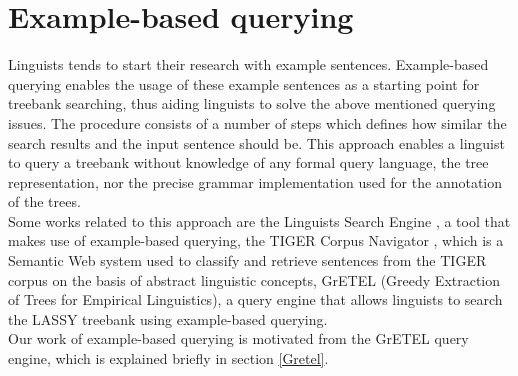 \documentclass[]{scrartcl}
\theoremstyle{exmp}
\begin{document}
\section{Example-based querying}\label{ExampleBasedQuerying}
Linguists tends to start their research with example sentences. Example-based querying enables the usage of these example sentences as a starting point for treebank searching, thus aiding linguists to solve the above mentioned querying issues. The procedure consists of a number of steps which defines how similar the search results and the input sentence should be. This approach enables a linguist to query a treebank without knowledge of any formal query language, the tree representation, nor the precise grammar implementation used for the annotation of the trees.\\
Some works related to this approach are the Linguist\textquotesingle s Search Engine \cite{Resnik}, a tool that makes use of example-based querying, the TIGER Corpus Navigator \cite{Hellman}, which is a Semantic Web system used to classify and retrieve sentences from the TIGER corpus on the basis of abstract linguistic concepts, GrETEL (Greedy Extraction of Trees for Empirical Linguistics)\cite{GrETEL}, a query engine that allows linguists to search the LASSY treebank\cite{LASSY} using example-based querying.\\
Our work of example-based querying is motivated from the GrETEL query engine, which is explained briefly in section \ref{Gretel}.
\end{document}
